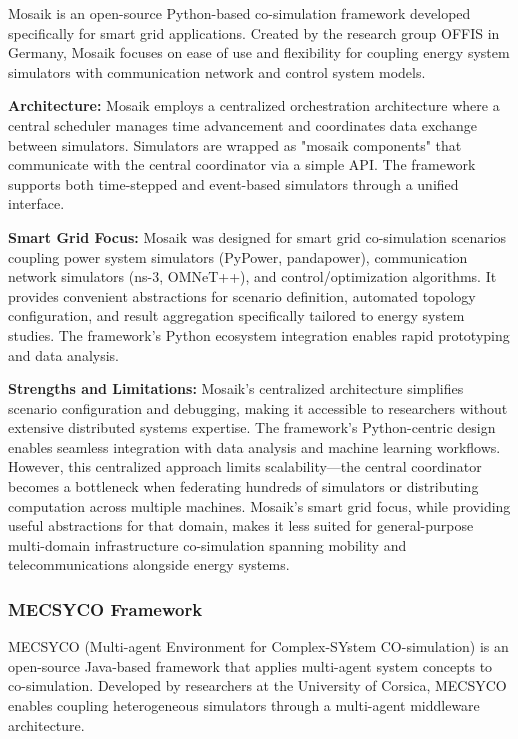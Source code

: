 Mosaik is an open-source Python-based co-simulation framework developed specifically for smart grid applications. Created by the research group OFFIS in Germany, Mosaik focuses on ease of use and flexibility for coupling energy system simulators with communication network and control system models.

\textbf{Architecture:} Mosaik employs a centralized orchestration architecture where a central scheduler manages time advancement and coordinates data exchange between simulators. Simulators are wrapped as "mosaik components" that communicate with the central coordinator via a simple API. The framework supports both time-stepped and event-based simulators through a unified interface.

\textbf{Smart Grid Focus:} Mosaik was designed for smart grid co-simulation scenarios coupling power system simulators (PyPower, pandapower), communication network simulators (ns-3, OMNeT++), and control/optimization algorithms. It provides convenient abstractions for scenario definition, automated topology configuration, and result aggregation specifically tailored to energy system studies. The framework's Python ecosystem integration enables rapid prototyping and data analysis.

\textbf{Strengths and Limitations:} Mosaik's centralized architecture simplifies scenario configuration and debugging, making it accessible to researchers without extensive distributed systems expertise. The framework's Python-centric design enables seamless integration with data analysis and machine learning workflows. However, this centralized approach limits scalability—the central coordinator becomes a bottleneck when federating hundreds of simulators or distributing computation across multiple machines. Mosaik's smart grid focus, while providing useful abstractions for that domain, makes it less suited for general-purpose multi-domain infrastructure co-simulation spanning mobility and telecommunications alongside energy systems.


\subsubsection{MECSYCO Framework}

MECSYCO (Multi-agent Environment for Complex-SYstem CO-simulation) is an open-source Java-based framework that applies multi-agent system concepts to co-simulation. Developed by researchers at the University of Corsica, MECSYCO enables coupling heterogeneous simulators through a multi-agent middleware architecture.

